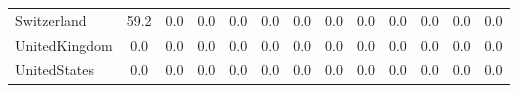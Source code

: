 \begin{table}[htbp]
\begin{tabular}{lcccccccccccc}
Switzerland &      59.2 &       0.0 &       0.0 &       0.0 &       0.0 &       0.0 &       0.0 &       0.0 &       0.0 &       0.0 &       0.0 &       0.0 \\  
UnitedKingdom &       0.0 &       0.0 &       0.0 &       0.0 &       0.0 &       0.0 &       0.0 &       0.0 &       0.0 &       0.0 &       0.0 &       0.0 \\  
UnitedStates &       0.0 &       0.0 &       0.0 &       0.0 &       0.0 &       0.0 &       0.0 &       0.0 &       0.0 &       0.0 &       0.0 &       0.0 \\  
\hline \hline \end{tabular}
\end{table}
